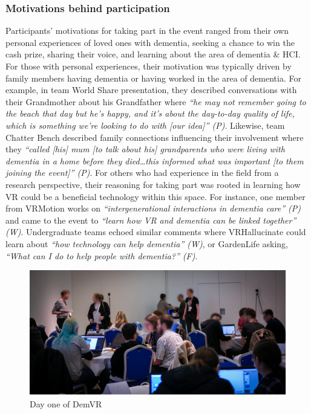 \subsubsection{Motivations behind participation}
\label{ThemeOne:subthemeOne}
Participants’ motivations for taking part in the event ranged from their own personal experiences of loved ones with dementia, seeking a chance to win the cash prize, sharing their voice, and learning about the area of dementia \& HCI. For those with personal experiences, their motivation was typically driven by family members having dementia or having worked in the area of dementia. For example, in team World Share presentation, they described conversations with their Grandmother about his Grandfather where \textit{“he may not remember going to the beach that day but he’s happy, and it’s about the day-to-day quality of life, which is something we’re looking to do with [our idea]” (P)}. Likewise, team Chatter Bench described family connections influencing their involvement where they \textit{“called [his] mum [to talk about his] grandparents who were living with dementia in a home before they died…this informed what was important [to them joining the event]” (P)}. For others who had experience in the field from a research perspective, their reasoning for taking part was rooted in learning how VR could be a beneficial technology within this space. For instance, one member from VRMotion works on \textit{“intergenerational interactions in dementia care” (P)} and came to the event to \textit{“learn how VR and dementia can be linked together” (W)}. Undergraduate teams echoed similar comments where VRHallucinate could learn about \textit{“how technology can help dementia” (W)}, or GardenLife asking, \textit{“What can I do to help people with dementia?” (F)}. 

\begin{figure}[htp]
\centering
\includegraphics[width=.8\linewidth]{Images/DemVR/Findings/DayOneDemVR.png}
\caption{Day one of DemVR}
\label{fig:DayOne}
\end{figure}

